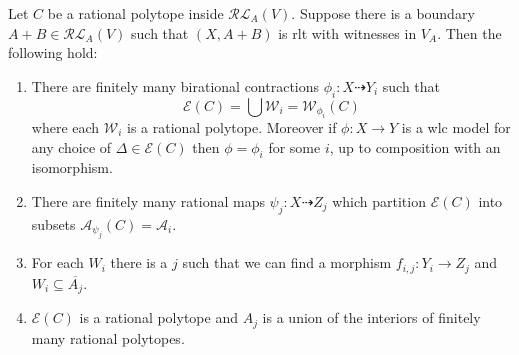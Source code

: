 	\begin{theorem}\label{rltfiniteness}
		Let $C$ be a rational polytope inside $\mathcal{RL}_{A}(V)$. Suppose there is a boundary $A+B \in \mathcal{RL}_{A}(V)$ such that $(X,A+B)$ is rlt with witnesses in $V_{A}$. Then the following hold:
		
		\begin{enumerate}
			\item There are finitely many birational contractions $\phi_{i}:X \dashrightarrow Y_{i}$ such that 
			\[\mathcal{E}(C) = \bigcup \mathcal{W}_{i}=\mathcal{W}_{\phi_{i}}(C)\]
			where each $\mathcal{W}_{i}$ is a rational polytope. Moreover if $\phi:X \to Y$ is a wlc model for any choice of $\Delta \in \mathcal{E}(C)$ then $\phi=\phi_{i}$ for some $i$, up to composition with an isomorphism.
			
			\item There are finitely many rational maps $\psi_{j}:X \dashrightarrow Z_{j}$ which partition $\mathcal{E}(C)$ into subsets $\mathcal{A}_{\psi_{j}}(C)=\mathcal{A}_{i}$.
			\item  For each $W_{i}$ there is a $j$ such that we can find a morphism $f_{i,j}: Y_{i} \to Z_{j}$ and $W_{i} \subseteq \overline{A_{j}}$.
			\item  $\mathcal{E}(C)$ is a rational polytope and $A_{j}$ is a union of the interiors of finitely many rational polytopes.
		\end{enumerate}
	\end{theorem}
	
